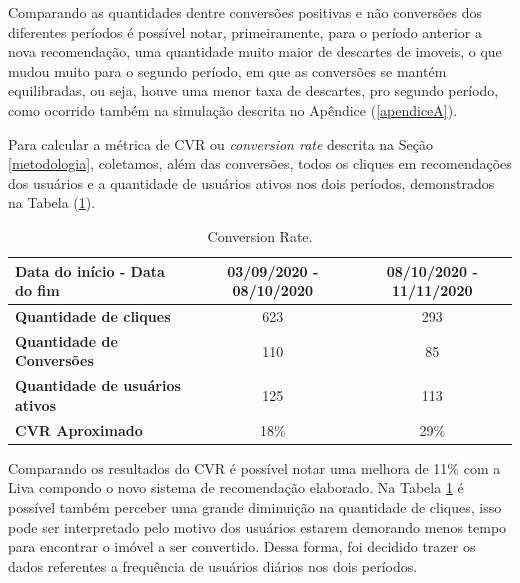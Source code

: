Comparando as quantidades dentre conversões positivas e não conversões dos diferentes períodos é possível notar, primeiramente, para o período anterior a nova recomendação, uma quantidade muito maior de descartes de imoveis, o que mudou muito para o segundo período, em que as conversões se mantém equilibradas, ou seja, houve uma menor taxa de descartes, pro segundo período, como ocorrido também na simulação descrita no Apêndice (\ref{apendiceA}).

Para calcular a métrica de CVR ou \textit{conversion rate} descrita na Seção \ref{metodologia}, coletamos, além das conversões, todos os cliques em recomendações dos usuários e a quantidade de usuários ativos nos dois períodos, demonstrados na Tabela (\ref{tab:my-table3}).

\begin{table}[H]
\centering
\caption[\textit{conversion rate}]{Conversion Rate.}
\begin{tabular}{lcc}
\hline
\textbf{Data do início - Data do fim} & 03/09/2020 - 08/10/2020 & 08/10/2020 - 11/11/2020 \\ \hline
\textbf{Quantidade de cliques} & 623 & 293 \\ \hline
\textbf{Quantidade de Conversões} & 110 & 85 \\ \hline
\textbf{Quantidade de usuários ativos} & 125 & 113 \\ \hline
\textbf{CVR Aproximado} & 18\% & 29\% \\ \hline
\end{tabular}
\label{tab:my-table3}
\end{table}

Comparando os resultados do CVR é possível notar uma melhora de 11\% com a Liva compondo o novo sistema de recomendação elaborado. Na Tabela \ref{tab:my-table3} é possível também perceber uma grande diminuição na quantidade de cliques, isso pode ser interpretado pelo motivo dos usuários estarem demorando menos tempo para encontrar o imóvel a ser convertido. Dessa forma, foi decidido trazer os dados referentes a frequência de usuários diários nos dois períodos.


